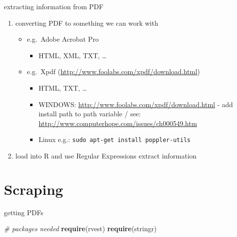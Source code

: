 \documentclass[ignorenonframetext,]{beamer}
\newenvironment{Shaded}{\begin{snugshade}}{\end{snugshade}}
\newcommand{\KeywordTok}[1]{\textcolor[rgb]{0.13,0.29,0.53}{\textbf{{#1}}}}
\newcommand{\CommentTok}[1]{\textcolor[rgb]{0.56,0.35,0.01}{\textit{{#1}}}}
\newcommand{\NormalTok}[1]{{#1}}
\providecommand{\tightlist}{%
  \setlength{\itemsep}{0pt}\setlength{\parskip}{0pt}}
\begin{document}
\begin{frame}[fragile]{extracting information from PDF}

\begin{enumerate}
\def\labelenumi{\arabic{enumi})}
\setcounter{enumi}{5}
\tightlist
\item
  converting PDF to something we can work with

  \begin{itemize}
  \tightlist
  \item
    e.g.~Adobe Acrobat Pro

    \begin{itemize}
    \tightlist
    \item
      HTML, XML, TXT, \ldots{}\\
    \end{itemize}
  \item
    e.g.~Xpdf (\url{http://www.foolabs.com/xpdf/download.html})

    \begin{itemize}
    \tightlist
    \item
      HTML, TXT, \ldots{}
    \item
      WINDOWS: \url{http://www.foolabs.com/xpdf/download.html} - add
      install path to path variable / see:
      \url{http://www.computerhope.com/issues/ch000549.htm}
    \item
      Linux e.g.: \texttt{sudo\ apt-get\ install\ poppler-utils}
    \end{itemize}
  \end{itemize}
\item
  load into R and use Regular Expressions extract information
\end{enumerate}

\end{frame}

\section{Scraping}\label{scraping}

\begin{frame}[fragile]{getting PDFs}

\begin{Shaded}
\begin{Highlighting}[]
\CommentTok{# packages needed}
\KeywordTok{require}\NormalTok{(rvest)}
\KeywordTok{require}\NormalTok{(stringr)}
\end{Highlighting}
\end{Shaded}

\end{frame}
\end{document}
